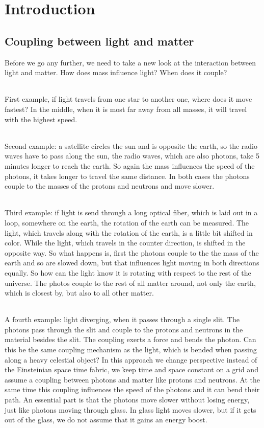 \chapter{Introduction}


\section{Coupling between light and matter}
Before we go any further, we need to take a new look at the interaction between light and matter. How does mass influence light? When does it couple? 
\paragraph{}
\subparagraph{}
First example, if light travels from one star to another one, where does it move fastest? In the middle, when it is most far away from all masses, it will travel with the highest speed. 
\subparagraph{}
Second example: a satellite circles the sun and is opposite the earth, so the radio waves have to pass along the sun, the radio waves, which are also photons, take 5 minutes longer to reach the earth. So again the mass influences the speed of the photons, it takes longer to travel the same distance. In both cases the photons couple to the masses of the protons and neutrons and move slower. 
\subparagraph{}
Third example: if light is send through a long optical fiber, which is laid out in a loop, somewhere on the earth, the rotation of the earth can be measured. The light, which travels along with the rotation of the earth, is a little bit shifted in color. While the light, which travels in the counter direction, is shifted in the opposite way. So what happens is, first the photons couple to the the mass of the earth and so are slowed down, but that influences light moving in both directions equally. So how can the light know it is rotating with respect to the rest of the universe. The photos couple to the rest of all matter around, not only the earth, which is closest by, but also to all other matter.
\subparagraph{}
A fourth example: light diverging, when it passes through a single slit. The photons pass through the slit and couple to the protons and neutrons in the material besides the slit. The coupling exerts a force and bends the photon. Can this be the same coupling mechanism as the light, which is bended when passing along a heavy celestial object?
In this approach we change perspective instead of the Einsteinian space time fabric, we keep time and space constant on a grid and assume a coupling between photons and matter like protons and neutrons. At the same time this coupling influences the speed of the photons and it can bend their path.
An essential part is that the photons move slower without losing energy, just like photons moving through glass. In glass light moves slower, but if it gets out of the glass, we do not assume that it gains an energy boost.


